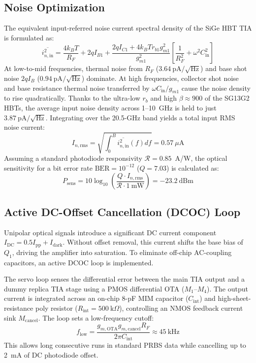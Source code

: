 \documentclass[conference]{IEEEtran}
\begin{document}
\subsection{Noise Optimization}
The equivalent input-referred noise current spectral density of the SiGe HBT TIA is formulated as:
\begin{equation}
\overline{i_{n,\text{in}}^2} = \frac{4k_B T}{R_F} + 2q I_{B1} + \frac{2q I_{C1} + 4k_B T r_{b1} g_{m1}^2}{g_{m1}^2} \left[ \frac{1}{R_F^2} + \omega^2 C_{\text{in}}^2 \right]
\end{equation}
At low-to-mid frequencies, thermal noise from $R_F$ ($3.64~\text{pA}/\sqrt{\text{Hz}}$) and base shot noise $2q I_B$ ($0.94~\text{pA}/\sqrt{\text{Hz}}$) dominate. At high frequencies, collector shot noise and base resistance thermal noise transferred by $\omega C_{\text{in}} / g_{m1}$ cause the noise density to rise quadratically. Thanks to the ultra-low $r_b$ and high $\beta \approx 900$ of the SG13G2 HBTs, the average input noise density across 1--10~GHz is held to just $3.87~\text{pA}/\sqrt{\text{Hz}}$. Integrating over the 20.5-GHz band yields a total input RMS noise current:
\begin{equation}
I_{n,\text{rms}} = \sqrt{\int_0^{B} \overline{i_{n,\text{in}}^2}(f) df} = 0.57~\mu\text{A}
\end{equation}
Assuming a standard photodiode responsivity $\mathcal{R} = 0.85$~A/W, the optical sensitivity for a bit error rate $\text{BER} = 10^{-12}$ ($Q = 7.03$) is calculated as:
\begin{equation}
P_{\text{sens}} = 10 \log_{10} \left( \frac{Q \cdot I_{n,\text{rms}}}{\mathcal{R} \cdot 1~\text{mW}} \right) = -23.2~\text{dBm}
\end{equation}

\subsection{Active DC-Offset Cancellation (DCOC) Loop}
Unipolar optical signals introduce a significant DC current component $I_{\text{DC}} = 0.5 I_{\text{pp}} + I_{\text{dark}}$. Without offset removal, this current shifts the base bias of $Q_1$, driving the amplifier into saturation. To eliminate off-chip AC-coupling capacitors, an active DCOC loop is implemented. 

The servo loop senses the differential error between the main TIA output and a dummy replica TIA stage using a PMOS differential OTA ($M_1$--$M_4$). The output current is integrated across an on-chip 8-pF MIM capacitor ($C_{\text{int}}$) and high-sheet-resistance poly resistor ($R_{\text{int}} = 500~\text{k}\Omega$), controlling an NMOS feedback current sink $M_{\text{cancel}}$. The loop sets a low-frequency cutoff:
\begin{equation}
f_{\text{low}} = \frac{g_{m,\text{OTA}} g_{m,\text{cancel}} R_F}{2\pi C_{\text{int}}} \approx 45~\text{kHz}
\end{equation}
This allows long consecutive runs in standard PRBS data while cancelling up to 2~mA of DC photodiode offset.
\end{document}
